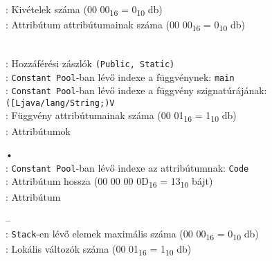 \begin{compactitem}
\begin{compactitem}
\begin{compactitem}
\begin{compactitem}
                : Kivételek száma (00 00\textsubscript{16} = 0\textsubscript{10} db) \\
                : Attribútum attribútumainak száma (00 00\textsubscript{16} = 0\textsubscript{10} db)
        \end{compactitem}
    \end{compactitem}
	\item {}     \\
    : Hozzáférési zászlók \lstinline{(Public, Static)} \\
    : \lstinline{Constant Pool}-ban lévő indexe a függvénynek: \lstinline{main} \\
    : \lstinline{Constant Pool}-ban lévő indexe a függvény szignatúrájának: \lstinline{([Ljava/lang/String;)V} \\
    : Függvény attribútumainak száma (00 01\textsubscript{16} = 1\textsubscript{10} db) \\
    : Attribútumok
    \begin{compactitem}
        \setlength\itemsep{-5px}
        \item[•]    \\
        : \lstinline{Constant Pool}-ban lévő indexe az attribútumnak: \lstinline{Code} \\
        : Attribútum hossza (00 00 00 0D\textsubscript{16} = 13\textsubscript{10} bájt) \\
        : Attribútum
            \begin{compactitem}
            \setlength\itemsep{0px}
                \item[–]       \\
                : \lstinline{Stack}-en lévő elemek maximális száma (00 00\textsubscript{16} = 0\textsubscript{10} db) \\
                : Lokális változók száma (00 01\textsubscript{16} = 1\textsubscript{10} db) \\

\end{compactitem}
\end{compactitem}
\end{compactitem}
\end{compactitem}

